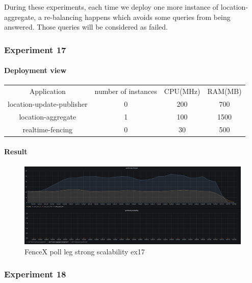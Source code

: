 \documentclass[a4]{report}
\begin{document}
    During these experiments, each time we deploy one more instance of location-aggregate, a re-balancing happens which
    avoids some queries from being answered.
    Those queries will be considered as failed.

    \subsubsection{Experiment 17}
    \paragraph{Deployment view}
    \begin{center}
        \begin{tabular}{ c c c c }
            Application               &  number of instances     & CPU(MHz)  & RAM(MB)    \\
            location-update-publisher &          0               & 200       &   700      \\
            location-aggregate        &          1               & 100      &   1500     \\
            realtime-fencing          &          0               & 30       &   500       \\
        \end{tabular}
    \end{center}

    \paragraph{Result}
    \begin{figure}[ht]
        \caption{FenceX poll leg strong scalability ex17}
        \label{fig:ex17}
        \includegraphics[scale=0.4]{images/evaluation/ex17-benchmarking-ongoing-2per4sec.png}
    \end{figure}

    \subsubsection{Experiment 18}
\end{document}
